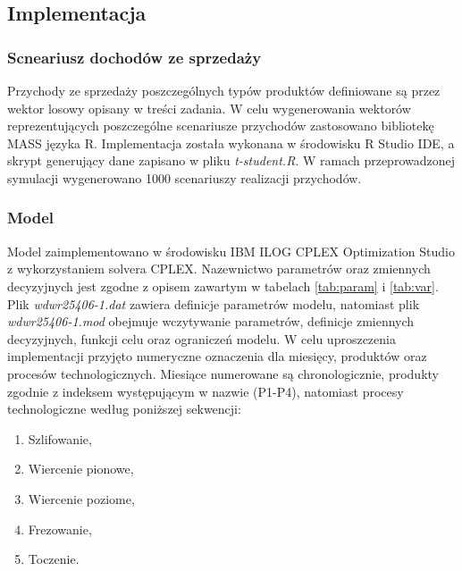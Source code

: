 \subsection{Implementacja}
\subsubsection{Scneariusz dochodów ze sprzedaży}
Przychody ze sprzedaży poszczególnych typów produktów definiowane są przez wektor losowy opisany w treści zadania. W celu wygenerowania wektorów 
reprezentujących poszczególne scenariusze przychodów zastosowano bibliotekę MASS języka R. Implementacja została wykonana w środowisku R Studio IDE, a 
skrypt generujący dane zapisano w pliku \textit{t-student.R}. W ramach przeprowadzonej symulacji wygenerowano 
1000 scenariuszy realizacji przychodów.

\subsubsection{Model}
Model zaimplementowano w środowisku IBM ILOG CPLEX Optimization Studio z wykorzystaniem solvera CPLEX. Nazewnictwo parametrów oraz zmiennych decyzyjnych 
jest zgodne z opisem zawartym w tabelach \ref{tab:param} i \ref{tab:var}. Plik \textit{wdwr25406-1.dat} zawiera definicje parametrów modelu, 
natomiast plik \textit{wdwr25406-1.mod} obejmuje wczytywanie parametrów, definicje zmiennych decyzyjnych, funkcji celu oraz ograniczeń modelu. 
W celu uproszczenia implementacji przyjęto numeryczne oznaczenia dla miesięcy, produktów oraz procesów technologicznych. Miesiące numerowane są chronologicznie, 
produkty zgodnie z indeksem występującym w nazwie (P1-P4), natomiast procesy technologiczne według poniższej sekwencji:
\begin{enumerate}
\item Szlifowanie,
\item Wiercenie pionowe,
\item Wiercenie poziome,
\item Frezowanie,
\item Toczenie.
\end{enumerate}

